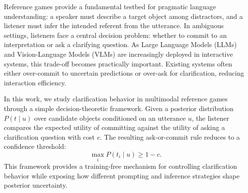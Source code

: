 \documentclass[11pt]{article}
\begin{document}



Reference games provide a fundamental testbed for pragmatic language understanding: a speaker must describe a target object among distractors, and a listener must infer the intended referent from the utterance. In ambiguous settings, listeners face a central decision problem: whether to commit to an interpretation or ask a clarifying question. As Large Language Models (LLMs) and Vision-Language Models (VLMs) are increasingly deployed in interactive systems, this trade-off becomes practically important. Existing systems often either over-commit to uncertain predictions or over-ask for clarification, reducing interaction efficiency.

In this work, we study clarification behavior in multimodal reference games through a simple decision-theoretic framework. Given a posterior distribution $P(t \mid u)$ over candidate objects conditioned on an utterance $u$, the listener compares the expected utility of committing against the utility of asking a clarification question with cost $c$. The resulting ask-or-commit rule reduces to a confidence threshold:
\[
\max_i P(t_i \mid u) \geq 1-c.
\]
This framework provides a training-free mechanism for controlling clarification behavior while exposing how different prompting and inference strategies shape posterior uncertainty.
\end{document}
